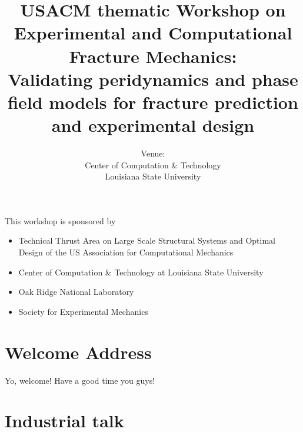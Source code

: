 \documentclass[12pt]{book}
\title{USACM thematic Workshop on Experimental and Computational Fracture Mechanics: \\
	\large Validating peridynamics and phase field models for fracture prediction and experimental design}
\author{Venue: \\ Center of Computation \& Technology \\ Louisiana State University}
\begin{document}
\frontmatter

\maketitle

This workshop is sponsored by

\begin{itemize}
\item Technical Thrust Area on Large Scale Structural Systems and Optimal Design of the US Association for Computational Mechanics
\item Center of Computation \& Technology at Louisiana State University
\item Oak Ridge National Laboratory
\item Society for Experimental Mechanics
\end{itemize}

\newpage



\chapter{Welcome Address}


Yo, welcome! Have a good time you guys!


\begin{sidewaysfigure}

\end{sidewaysfigure}


\tableofcontents

\mainmatter

\chapter{Industrial talk}
\end{document}
